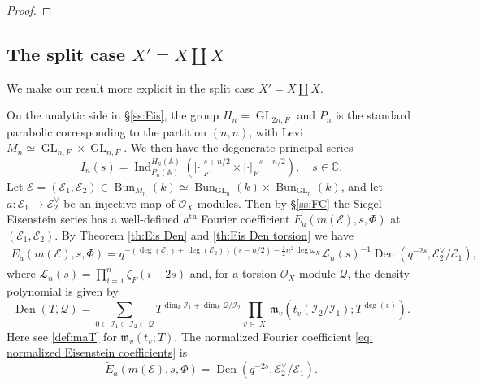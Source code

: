 \documentclass[reqno]{amsart}
\numberwithin{equation}{section}
\newcommand{\BA}{\ensuremath{\mathbb{A}}\xspace}
\newcommand{\sL}{\ensuremath{\mathscr{L}}\xspace}
\newcommand\mnote[1]{\marginpar{\tiny #1}}
\newcommand{\wt}[1]{\widetilde{#1}}
\newcommand{\sgn}{\operatorname{sgn}}
\newcommand{\ol}[1]{\overline{#1}}
\newcommand{\mrm}[1]{\mathrm{#1}}
\DeclareMathOperator{\GL}{GL}
\DeclareMathOperator{\Tr}{Tr}
\DeclareMathOperator{\Ind}{Ind}
\DeclareMathOperator{\Bun}{Bun}
\DeclareMathOperator{\Den}{Den}
\newcommand\cE{\mathcal{E}}
\newcommand\cI{\mathcal{I}}
\newcommand\cO{\mathcal{O}}
\newcommand\cQ{\mathcal{Q}}
\newcommand\fm{\mathfrak{m}}
\theoremstyle{remark}
\numberwithin{equation}{section}
\begin{document}
\begin{proof}
%

\end{proof}


\subsection{The split case $X'=X\coprod X$}
We make our result more explicit in the split case $X'=X\coprod X$.
  
  On the analytic side in \S\ref{ss:Eis}, the group $H_n=\GL_{2n,F}$ and $P_n$ is the standard parabolic corresponding to the partition $(n,n)$, with Levi $M_n\simeq \GL_{n,F}\times \GL_{n,F}$. We then have the degenerate principal series
  $$
I_n(s)=\Ind_{P_n(\BA)}^{H_n(\BA)}( |\cdot|_{F}^{s+n/2}\times |\cdot|_{F}^{-s-n/2}),\quad s\in \mathbb{C}.
$$
Let $\cE=(\cE_1,\cE_2)\in \Bun_{M_n}(k)\simeq\Bun_{\GL_n}(k)\times \Bun_{\GL_n}(k)$, and let $a:\cE_1\to\cE_2^\vee$ be an injective map of $\cO_X$-modules. Then by \S\ref{ss:FC} the Siegel--Eisenstein series has a well-defined $a^{\mrm{th}}$ Fourier coefficient $E_{a}(m(\cE),s,\Phi)$ at $(\cE_1,\cE_2)$. By Theorem \ref{th:Eis Den}  and \ref{th:Eis Den torsion} we have
  \begin{eqnarray*}
E_{a}(m(\cE),s,\Phi)=q^{-(\deg(\cE_1)+\deg(\cE_2))( s-n/2)-\frac{1}{2}n^2\deg\omega_X }\sL_n(s) ^{-1} \Den(q^{-2s},  \cE_2^\vee/\cE_1),
\end{eqnarray*}
where $\sL_n(s)=\prod_{i=1}^n\zeta_F(i+2s)$ and, for a torsion $\cO_X$-module $\cQ$, the density polynomial is given by
$$
 \Den(T,  \cQ)=\sum_{0 \subset \cI_1 \subset \cI_2\subset \cQ} T^{\dim_{k}\cI_1+\dim_k \cQ/\cI_2}\prod_{v\in |X|}\fm_{v}(t_v(\cI_2/\cI_1);T^{\deg(v)}).
$$
Here see \eqref{def:maT} for $\fm_{v}(t_v;T)$.
The normalized Fourier coefficient \eqref{eq: normalized Eisenstein coefficients} is
\[
\wt{E}_{a}(m(\cE),s,\Phi)  =  \Den(q^{-2s},  \cE_2^\vee/\cE_1).
\]
\end{document}
